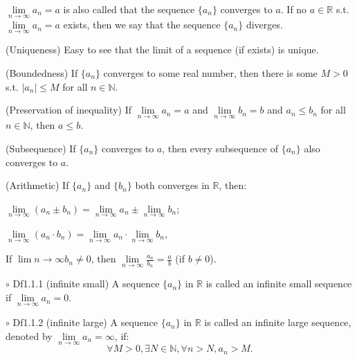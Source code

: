 \documentclass{article}
\begin{document}
\begin{Rmk}{}
    \begin{compactenum}
        \item \textcolor{Df}{$\lim\limits_{n\to\infty}a_n=a$ is also called that the sequence $\{a_n\}$ converges to $a$. If no $a\in\mathbb{R}$ s.t. $\lim\limits_{n\to\infty}a_n=a$ exists, then we say that the sequence $\{a_n\}$ diverges.}
        \item \textcolor{Th}{(Uniqueness) Easy to see that the limit of a sequence (if exists) is unique.}
        \item \textcolor{Th}{(Boundedness) If $\{a_n\}$ converges to some real number, then there is some $M>0$ s.t. $|a_n|\leq M$ for all $n\in\mathbb{N}$.}
        \item \textcolor{Th}{(Preservation of inequality) If $\lim\limits_{n\to\infty}a_n=a$ and $\lim\limits_{n\to\infty}b_n=b$ and $a_n\leq b_n$ for all $n\in\mathbb{N}$, then $a\leq b$.}
        \item \textcolor{Th}{(Subsequence) If $\{a_n\}$ converges to $a$, then every subsequence of $\{a_n\}$ also converges to $a$.}
        \item \textcolor{Th}{(Arithmetic) If $\{a_n\}$ and $\{b_n\}$ both converges in $\mathbb{R}$, then:
            \begin{compactitem}
                \item $\lim\limits_{n\to\infty}(a_n\pm b_n)=\lim\limits_{n\to\infty}a_n\pm \lim\limits_{n\to\infty}b_n$; 
                \item $\lim\limits_{n\to\infty}(a_n\cdot b_n)=\lim\limits_{n\to\infty}a_n\cdot \lim\limits_{n\to\infty}b_n$, 
                \item If $\lim\limits{n\to\infty} b_n\neq 0$, then $\lim\limits_{n\to\infty}\frac{a_n}{b_n}=\frac{a}{b}$ (if $b\neq 0$).
            \end{compactitem}
        }
    \end{compactenum}
\end{Rmk}

\begin{Df}{$\circ$ Df1.1.1 (infinite small)}
    A sequence $\{a_n\}$ in $\mathbb{R}$ is called an infinite small sequence if $\lim\limits_{n\to\infty}a_n=0$.
\end{Df}

\begin{Df}{$\circ$ Df1.1.2 (infinite large)}
    A sequence $\{a_n\}$ in $\mathbb{R}$ is called an infinite large sequence, denoted by $\lim\limits_{n\to\infty}a_n=\infty$, if:
    $$\forall M>0, \exists N\in\mathbb{N}, \forall n > N, a_n>M.$$
\end{Df}
\end{document}
